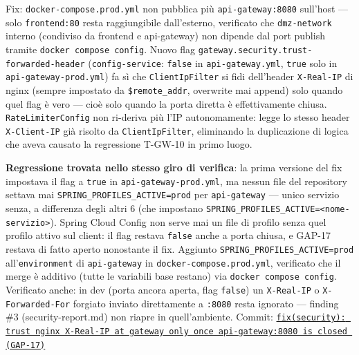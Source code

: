 ﻿\documentclass[a4paper,12pt]{report}
\newcommand{\commitref}[2]{\texttt{\small \href{https://github.com/diegoandruccioli/hotel-pms/commit/#1}{#2}}}
\begin{document}
Fix: \texttt{docker-compose.prod.yml} non pubblica più \texttt{api-gateway:8080}
sull'host --- solo \texttt{frontend:80} resta raggiungibile dall'esterno,
verificato che \texttt{dmz-network} interno (condiviso da frontend e
api-gateway) non dipende dal port publish tramite \texttt{docker compose
config}. Nuovo flag \texttt{gateway.security.trust-forwarded-header}
(\texttt{config-service}: \texttt{false} in \texttt{api-gateway.yml},
\texttt{true} solo in \texttt{api-gateway-prod.yml}) fa sì che
\texttt{ClientIpFilter} si fidi dell'header \texttt{X-Real-IP} di nginx
(sempre impostato da \texttt{\$remote\_addr}, overwrite mai append) solo
quando quel flag è vero --- cioè solo quando la porta diretta è
effettivamente chiusa. \texttt{RateLimiterConfig} non ri-deriva più l'IP
autonomamente: legge lo stesso header \texttt{X-Client-IP} già risolto da
\texttt{ClientIpFilter}, eliminando la duplicazione di logica che aveva
causato la regressione T-GW-10 in primo luogo.

\textbf{Regressione trovata nello stesso giro di verifica}: la prima
versione del fix impostava il flag a \texttt{true} in
\texttt{api-gateway-prod.yml}, ma nessun file del repository settava mai
\texttt{SPRING\_PROFILES\_ACTIVE=prod} per \texttt{api-gateway} --- unico
servizio senza, a differenza degli altri 6 (che impostano
\texttt{SPRING\_PROFILES\_ACTIVE=<nome-servizio>}). Spring Cloud Config non
serve mai un file di profilo senza quel profilo attivo sul client: il
flag restava \texttt{false} anche a porta chiusa, e GAP-17 restava di
fatto aperto nonostante il fix. Aggiunto \texttt{SPRING\_PROFILES\_ACTIVE=prod}
all'\texttt{environment} di \texttt{api-gateway} in
\texttt{docker-compose.prod.yml}, verificato che il merge è additivo
(tutte le variabili base restano) via \texttt{docker compose config}.
Verificato anche: in dev (porta ancora aperta, flag \texttt{false}) un
\texttt{X-Real-IP} o \texttt{X-Forwarded-For} forgiato inviato
direttamente a \texttt{:8080} resta ignorato --- finding \#3
(security-report.md) non riapre in quell'ambiente.
Commit: \commitref{ff432e3}{fix(security): trust nginx X-Real-IP at gateway only once api-gateway:8080 is closed (GAP-17)}
\end{document}
